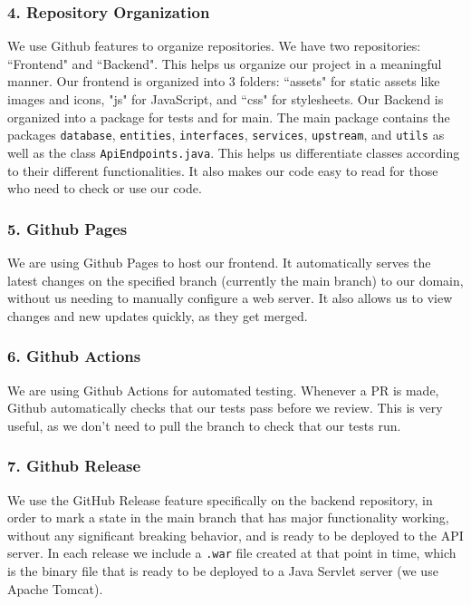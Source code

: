 \documentclass[fontsize=14pt]{article}
\def\code#1{\texttt{#1}}
\begin{document}
\subsubsection*{4. Repository Organization}

We use Github features to organize repositories. We have two repositories: ``Frontend" and ``Backend". This helps us organize our project in a meaningful manner.
Our frontend is organized into 3 folders: ``assets" for static assets like images and icons, "js" for JavaScript, and ``css" for stylesheets.
Our Backend is organized into a package for tests and for main. The main package contains the packages \code{database}, \code{entities}, \code{interfaces}, \code{services}, \code{upstream}, and \code{utils} as well as the class \code{ApiEndpoints.java}. This helps us differentiate classes according to their different functionalities. It also makes our code easy to read for those who need to check or use our code. 

\subsubsection*{5. Github Pages}
We are using Github Pages to host our frontend. It automatically serves the latest changes on the specified branch (currently the main branch) to our domain, without us needing to manually configure a web server. It also allows us to view changes and new updates quickly, as they get merged.

\subsubsection*{6. Github Actions}
We are using Github Actions for automated testing. Whenever a PR is made, Github automatically checks that our tests pass before we review. This is very useful, as we don't need to pull the branch to check that our tests run.

\subsubsection*{7. Github Release}
We use the GitHub Release feature specifically on the backend repository, in order to mark a state in the main branch that has major functionality working, without any significant breaking behavior, and is ready to be deployed to the API server. In each release we include a \code{.war} file created at that point in time, which is the binary file that is ready to be deployed to a Java Servlet server (we use Apache Tomcat).
\end{document}
